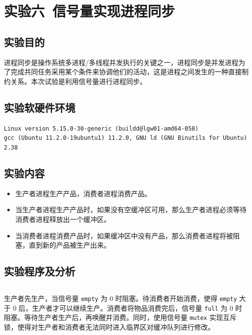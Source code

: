 \documentclass{article}
\begin{document}
	\section{实验六\ 信号量实现进程同步}
		\subsection{实验目的}
			进程同步是操作系统多进程/多线程并发执行的关键之一，进程同步是并发进程为了完成共同任务采用某个条件来协调他们的活动，这是进程之间发生的一种直接制约关系。本次试验是利用信号量进行进程同步。

		\subsection{实验软硬件环境}
			\texttt{Linux version 5.15.0-30-generic (buildd@lgw01-amd64-058) \\ gcc (Ubuntu 11.2.0-19ubuntu1) 11.2.0, GNU ld (GNU Binutils for Ubuntu) 2.38}

		\subsection{实验内容}
			\begin{itemize}
				\item 生产者进程生产产品，消费者进程消费产品。
				\item 当生产者进程生产产品时，如果没有空缓冲区可用，那么生产者进程必须等待消费者进程释放出一个缓冲区。
				\item 当消费者进程消费产品时，如果缓冲区中没有产品，那么消费者进程将被阻塞，直到新的产品被生产出来。
			\end{itemize}

		\subsection{实验程序及分析}
			\inputminted[linenos,breaklines,tabsize=4]{c}{lib6/lib6.c}

			生产者先生产，当信号量 \texttt{empty} 为 0 时阻塞。待消费者开始消费，使得 \texttt{empty} 大于 0 后，生产者才可以继续生产。消费者将物品消费完后，信号量 \texttt{full} 为 0 时阻塞。等待生产者生产后，再唤醒并消费。同时，使用信号量 \texttt{mutex} 实现互斥锁，使得对生产者和消费者无法同时进入临界区对缓冲队列进行修改。

			\newpage
\end{document}
